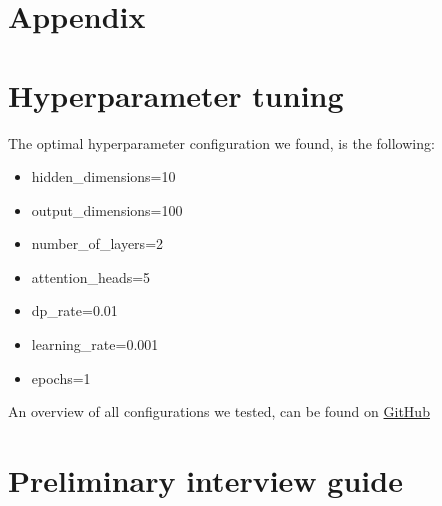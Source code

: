 \section{Appendix}
\appendix
\section{Hyperparameter tuning}
\label{app:hyperparameters}

The optimal hyperparameter configuration we found, is the following: 

\begin{itemize}
    \item hidden\_dimensions=10
    \item output\_dimensions=100
    \item number\_of\_layers=2
    \item attention\_heads=5
    \item dp\_rate=0.01
    \item learning\_rate=0.001
    \item epochs=1
\end{itemize}

An overview of all configurations we tested, can be found on \href{https://github.com/Roan-Schellingerhout/JRS_explanations}{GitHub}

\section{Preliminary interview guide}
\label{app:interview_guide}

